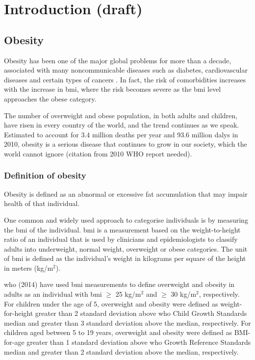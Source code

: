 \chapter{Introduction (draft)}
\label{ch:intro}


\section{Obesity}
\label{sec:obesity}

Obesity has been one of the major global problems for more than a decade, associated with many noncommunicable diseases such as diabetes, cardiovascular diseases and certain types of cancers \citep{WHO2014}.
In fact, the risk of comorbidities increases with the increase in \gls{bmi}, where the risk becomes severe as the \gls{bmi} level approaches the obese category.

The number of overweight and obese population, in both adults and children, have risen in every country of the world, and the trend continues as we speak.
Estimated to account for 3.4 million deaths per year and 93.6 million \glspl{daly} in 2010, obesity is a serious disease that continues to grow in our society, which the world cannot ignore (citation from 2010 WHO report needed).

\subsection{Definition of obesity}
\label{sub:definition_of_obesity}

Obesity is defined as an abnormal or excessive fat accumulation that may impair health of that individual.

One common and widely used approach to categorise individuals is by measuring the \gls{bmi} of the individual.
\gls{bmi} is a measurement based on the weight-to-height ratio of an individual that is used by clinicians and epidemiologists to classify adults into underweight, normal weight, overweight or obese categories.
The unit of \gls{bmi} is defined as the individual's weight in kilograms per square of the height in meters (kg/m$^2$).

\gls{who} (2014) have used \gls{bmi} measurements to define overweight and obesity in adults as an individual with \gls{bmi} $\geq$ 25 kg/m$^2$ and $\geq$ 30 kg/m$^2$, respectively.
For children under the age of 5, overweight and obesity were defined as weight-for-height greater than 2 standard deviation above \gls{who} Child Growth Standards median and greater than 3 standard deviation above the median, respectively.
For children aged between 5 to 19 years, overweight and obesity were defined as BMI-for-age greater than 1 standard deviation above \gls{who} Growth Reference Standards median and greater than 2 standard deviation above the median, respectively.

